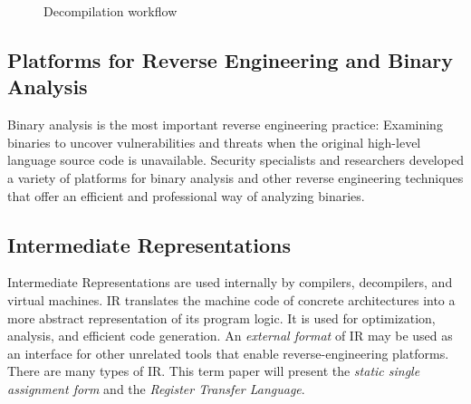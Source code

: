 \documentclass[seminar]{plai}
\begin{document}
\begin{figure}[htbp]
\centering
{}
\caption{Decompilation workflow\cite{reverse-engineering-vs-disassembly}}
\label{fig:interpret-bytecode}
\end{figure}


\subsection{Platforms for Reverse Engineering and Binary Analysis}
\label{sec:platforms-for-reverse-engineering-binaryAnalysis-background}
Binary analysis is the most important reverse engineering practice: Examining binaries to uncover vulnerabilities and threats when the original high-level language source code is unavailable.
Security specialists and researchers developed a variety of platforms for binary analysis and other reverse engineering techniques that offer an efficient and professional way of analyzing binaries.

\subsection{Intermediate Representations}
\label{sec:ir-background}
Intermediate Representations are used internally by compilers, decompilers, and virtual machines.
IR translates the machine code of concrete architectures into a more abstract representation of its program logic.
It is used for optimization, analysis, and efficient code generation. An \textit{external format} of IR may be used as an interface for other unrelated tools that enable reverse-engineering platforms.
There are many types of IR. This term paper will present the \textit{static single assignment form} and the \textit{Register Transfer Language}.\\
\end{document}
